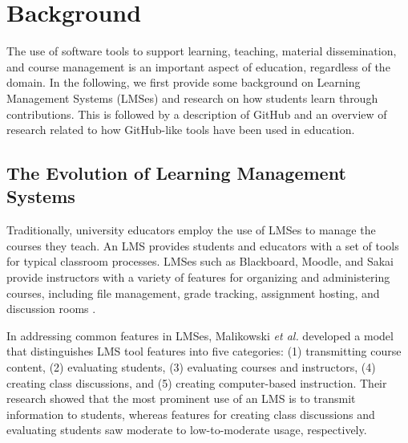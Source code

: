 



\section{Background}
The use of software tools to support learning, teaching, material dissemination, and course management is an important aspect of education, regardless of the domain. In the following, we first provide some background on Learning Management Systems (LMSes) and research on how students learn through contributions. This is followed by a description of GitHub and an overview of research related to how GitHub-like tools have been used in education.

\subsection{The Evolution of Learning Management Systems}
Traditionally, university educators employ the use of LMSes to manage the courses they teach. An LMS provides students and educators with a set of tools for typical classroom processes. LMSes such as Blackboard, Moodle, and Sakai provide instructors with a variety of features for organizing and administering courses, including file management, grade tracking, assignment hosting, and discussion rooms \cite{kumar2011comparative}.

In addressing common features in LMSes, Malikowski \emph{et al.} \cite{malikowski2007model} developed a model that distinguishes LMS tool features into five categories: (1) transmitting course content, (2) evaluating students, (3) evaluating courses and instructors, (4) creating class discussions, and (5) creating computer-based instruction. Their research showed that the most prominent use of an LMS is to transmit information to students, whereas features for creating class discussions and evaluating students saw moderate to low-to-moderate usage, respectively.

